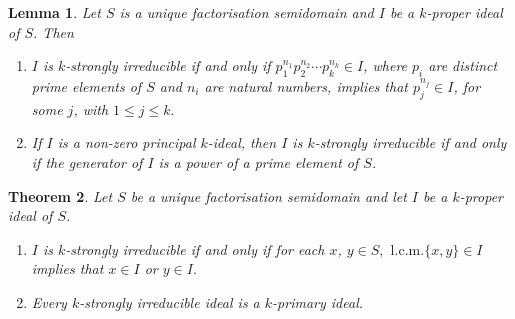 \documentclass[11pt,english]{amsart}
\newtheorem{theorem}{Theorem}[section]
\newtheorem{lemma}[theorem]{Lemma}
\theoremstyle{definition}
\numberwithin{equation}{section}
\begin{document}
\begin{lemma}\label{loc15}
    Let $S$ is a unique factorisation semidomain and $I$ be a $k$-proper ideal of $S$. Then
    \begin{enumerate}
        \item $I$ is $k$-strongly irreducible if and only if $p_1^{n_1} p_2^{n_2}\cdots p_k^{n_k}\in I$, where $p_i$ are distinct
        prime elements of $S$ and $n_i$ are natural numbers, implies that $p_j^{n_j} \in I$, for some $j$, with $1 \leqslant j \leqslant k.$

    \item If $I$ is a non-zero principal $k$-ideal, then $I$ is $k$-strongly irreducible if and only if the generator of $I$ is a power of a prime element of $S$.
    \end{enumerate}
\end{lemma}

\begin{theorem}\label{loc2}
Let $S$ be a unique factorisation semidomain and let $I$ be a $k$-proper ideal of $S$.
\begin{enumerate}
\item $I$ is $k$-strongly irreducible if and only if for each $x$, $y \in S,$ $\mathrm{l.c.m.}\{x,y\} \in I$ implies that
$x \in I$ or $y \in I.$

\item Every $k$-strongly irreducible ideal is a $k$-primary ideal.
\end{enumerate}
\end{theorem}
\end{document}
